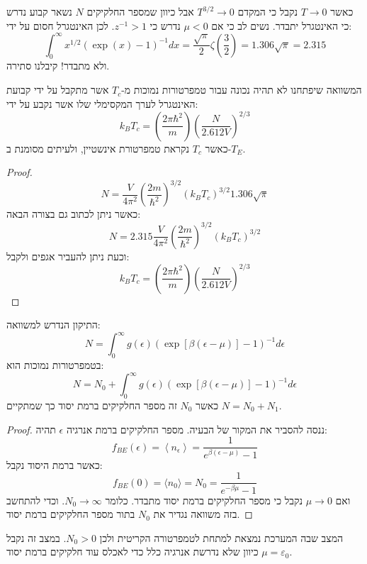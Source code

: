 \documentclass{tstextbook}
\begin{document}
\begin{corollary}
כאשר \(T\to 0\) נקבל כי המקדם \(T^{3/2}\to 0\) אבל כיוון שמספר החלקיקים \(N\) נשאר קבוע נדרש כי האינטגרל יתבדר. נשים לב כי אם \(\mu< 0\) נדרש כי \(z^{-1}>1\). לכן האינטגרל חסום על ידי:
$$\int_{0}^{\infty}x^{1/2}\left(\exp(x)-1\right)^{-1}d x={\frac{\sqrt{\pi}}{2}}\zeta\left({\frac{3}{2}}\right)=1.306{\sqrt{\pi}}=2.315$$
ולא מתבדר! קיבלנו סתירה.

\end{corollary}
\begin{corollary}
המשוואה שיפתחנו לא תהיה נכונה עבור טמפרטורות נמוכות מ-\(T_c\) אשר מתקבל על ידי קבועת האינטגרל לערך המקסימלי שלו אשר נקבע על ידי:
$$k_{B}T_c=\left(\frac{2\pi\hbar^{2}}{m}\right)\left(\frac{N}{2.612V}\right)^{2/3}$$
כאשר \(T_c\) נקראת טמפרטורת אינשטיין, ולעיתים מסומנת ב-\(T_{E}\).

\end{corollary}
\begin{proof}
$$N=\frac{V}{4\pi^{2}}\left(\frac{2m}{\hbar^{2}}\right)^{3/2}\left(k_{B}T_c\right)^{3/2}1.306\sqrt{\pi}$$
כאשר ניתן לכתוב גם בצורה הבאה:
$$N=2.315\frac{V}{4\pi^{2}}\left(\frac{2m}{\hbar^{2}}\right)^{3/2}(k_{B}T_c)^{3/2}$$
וכעת ניתן להעביר אגפים ולקבל:
$$k_{B}T_c=\left(\frac{2\pi\hbar^{2}}{m}\right)\left(\frac{N}{2.612V}\right)^{2/3}$$

\end{proof}
\begin{proposition}
התיקון הנדרש למשוואה:
$$N=\int_{0}^{\infty}g\left( \epsilon \right)\left(\exp\left[ \beta\left( \epsilon-\mu \right) \right]-1\right)^{-1}d\epsilon$$
בטמפרטורות נמוכות הוא:
$$N=N_{0}+\int_{0}^{\infty}g(\epsilon)\left(\exp[\beta(\epsilon-\mu)]-1\right)^{-1}d\epsilon$$
כאשר \(N_{0}\) זה מספר החלקיקים ברמת יסוד כך שמתקיים \(N=N_{0}+N_{1}\).

\end{proposition}
\begin{proof}
ננסה להסביר את המקור של הבעיה. מספר החלקיקים ברמת אנרגיה \(\epsilon\) תהיה:
$$f_{B E}\left( \epsilon \right)=\left\langle  n_{\epsilon} \right\rangle=\frac{1}{e^{\beta(\epsilon-\mu)}-1}$$
כאשר ברמת היסוד נקבל:
$$f_{B E}(0)=\langle n_{0}\rangle=N_{0}=\frac{1}{e^{-\beta\mu}-1}$$
ואם \(\mu\to 0\) נקבל כי מספר החלקיקים ברמת יסוד מתבדר. כלומר \(N_{0}\to \infty\). וכדי להתחשב בזה משוואה נגדיר את \(N_{0}\) בתור מספר החלקיקים ברמת יסוד.

\end{proof}
\begin{definition}
המצב שבה המערכת נמצאת למתחת לטמפרטורה הקריטית ולכן \(N_{0}> 0\). במצב זה נקבל \(\mu=\varepsilon_{0}\) כיוון שלא נדרשת אנרגיה כלל כדי לאכלס עוד חלקיקים ברמת יסוד.

\end{definition}
\end{document}
